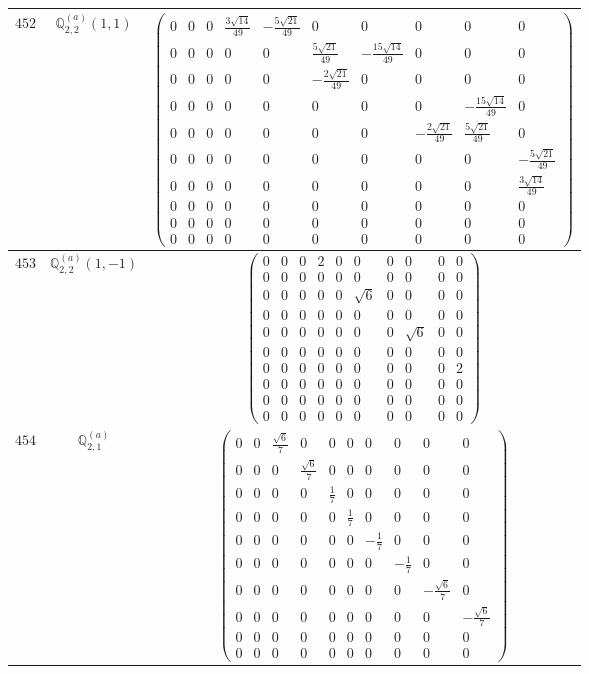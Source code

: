 \documentclass[fleqn,8pt,landscape]{jsarticle}
\begin{document}
\begin{center}
\begin{longtable}{ccc}
$ 452 $ & $ \mathbb{Q}_{2,2}^{(a)}(1,1) $ & $ \begin{pmatrix} 0 & 0 & 0 & \frac{3 \sqrt{14}}{49} & - \frac{5 \sqrt{21}}{49} & 0 & 0 & 0 & 0 & 0 \\ 0 & 0 & 0 & 0 & 0 & \frac{5 \sqrt{21}}{49} & - \frac{15 \sqrt{14}}{49} & 0 & 0 & 0 \\ 0 & 0 & 0 & 0 & 0 & - \frac{2 \sqrt{21}}{49} & 0 & 0 & 0 & 0 \\ 0 & 0 & 0 & 0 & 0 & 0 & 0 & 0 & - \frac{15 \sqrt{14}}{49} & 0 \\ 0 & 0 & 0 & 0 & 0 & 0 & 0 & - \frac{2 \sqrt{21}}{49} & \frac{5 \sqrt{21}}{49} & 0 \\ 0 & 0 & 0 & 0 & 0 & 0 & 0 & 0 & 0 & - \frac{5 \sqrt{21}}{49} \\ 0 & 0 & 0 & 0 & 0 & 0 & 0 & 0 & 0 & \frac{3 \sqrt{14}}{49} \\ 0 & 0 & 0 & 0 & 0 & 0 & 0 & 0 & 0 & 0 \\ 0 & 0 & 0 & 0 & 0 & 0 & 0 & 0 & 0 & 0 \\ 0 & 0 & 0 & 0 & 0 & 0 & 0 & 0 & 0 & 0 \end{pmatrix} $ \\ \hline
$ 453 $ & $ \mathbb{Q}_{2,2}^{(a)}(1,-1) $ & $ \begin{pmatrix} 0 & 0 & 0 & 2 & 0 & 0 & 0 & 0 & 0 & 0 \\ 0 & 0 & 0 & 0 & 0 & 0 & 0 & 0 & 0 & 0 \\ 0 & 0 & 0 & 0 & 0 & \sqrt{6} & 0 & 0 & 0 & 0 \\ 0 & 0 & 0 & 0 & 0 & 0 & 0 & 0 & 0 & 0 \\ 0 & 0 & 0 & 0 & 0 & 0 & 0 & \sqrt{6} & 0 & 0 \\ 0 & 0 & 0 & 0 & 0 & 0 & 0 & 0 & 0 & 0 \\ 0 & 0 & 0 & 0 & 0 & 0 & 0 & 0 & 0 & 2 \\ 0 & 0 & 0 & 0 & 0 & 0 & 0 & 0 & 0 & 0 \\ 0 & 0 & 0 & 0 & 0 & 0 & 0 & 0 & 0 & 0 \\ 0 & 0 & 0 & 0 & 0 & 0 & 0 & 0 & 0 & 0 \end{pmatrix} $ \\ \hline
$ 454 $ & $ \mathbb{Q}_{2,1}^{(a)} $ & $ \begin{pmatrix} 0 & 0 & \frac{\sqrt{6}}{7} & 0 & 0 & 0 & 0 & 0 & 0 & 0 \\ 0 & 0 & 0 & \frac{\sqrt{6}}{7} & 0 & 0 & 0 & 0 & 0 & 0 \\ 0 & 0 & 0 & 0 & \frac{1}{7} & 0 & 0 & 0 & 0 & 0 \\ 0 & 0 & 0 & 0 & 0 & \frac{1}{7} & 0 & 0 & 0 & 0 \\ 0 & 0 & 0 & 0 & 0 & 0 & - \frac{1}{7} & 0 & 0 & 0 \\ 0 & 0 & 0 & 0 & 0 & 0 & 0 & - \frac{1}{7} & 0 & 0 \\ 0 & 0 & 0 & 0 & 0 & 0 & 0 & 0 & - \frac{\sqrt{6}}{7} & 0 \\ 0 & 0 & 0 & 0 & 0 & 0 & 0 & 0 & 0 & - \frac{\sqrt{6}}{7} \\ 0 & 0 & 0 & 0 & 0 & 0 & 0 & 0 & 0 & 0 \\ 0 & 0 & 0 & 0 & 0 & 0 & 0 & 0 & 0 & 0 \end{pmatrix} $ \\ \hline

\end{longtable}
\end{center}
\end{document}
